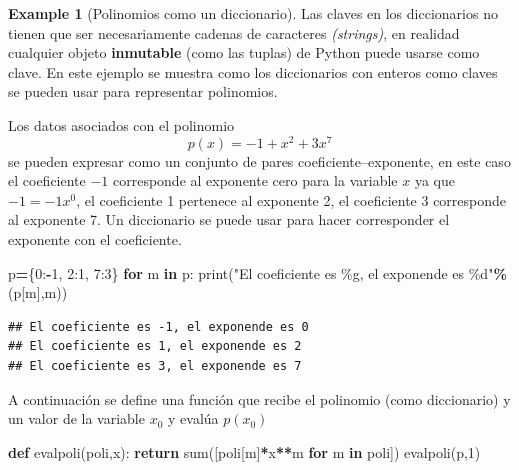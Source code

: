 \documentclass[
]{book}
\newenvironment{Shaded}{\begin{snugshade}}{\end{snugshade}}
\newcommand{\BuiltInTok}[1]{#1}
\newcommand{\ControlFlowTok}[1]{\textcolor[rgb]{0.13,0.29,0.53}{\textbf{#1}}}
\newcommand{\DecValTok}[1]{\textcolor[rgb]{0.00,0.00,0.81}{#1}}
\newcommand{\KeywordTok}[1]{\textcolor[rgb]{0.13,0.29,0.53}{\textbf{#1}}}
\newcommand{\NormalTok}[1]{#1}
\newcommand{\OperatorTok}[1]{\textcolor[rgb]{0.81,0.36,0.00}{\textbf{#1}}}
\newcommand{\SpecialCharTok}[1]{\textcolor[rgb]{0.00,0.00,0.00}{#1}}
\newcommand{\StringTok}[1]{\textcolor[rgb]{0.31,0.60,0.02}{#1}}
\theoremstyle{definition}
\theoremstyle{definition}
\newtheorem{example}{Example}[chapter]
\theoremstyle{definition}
\theoremstyle{definition}
\theoremstyle{remark}
\begin{document}
\begin{example}[Polinomios como un diccionario]
\protect\hypertarget{exm:PoliComoDict}{}\label{exm:PoliComoDict}Las claves en los diccionarios no tienen que ser necesariamente cadenas de caracteres \emph{(strings)}, en realidad cualquier objeto \textbf{inmutable} (como las tuplas) de Python puede usarse como clave. En este ejemplo se muestra como los diccionarios con enteros como claves se pueden usar para representar polinomios.

Los datos asociados con el polinomio
\begin{equation}
p(x)=-1+x^2 + 3x^7
\label{eq:polinomio}
\end{equation}
se pueden expresar como un conjunto de pares coeficiente--exponente, en este caso el coeficiente \(-1\) corresponde al exponente cero para la variable \(x\) ya que \(-1=-1x^0\), el coeficiente 1 pertenece al exponente 2, el coeficiente 3 corresponde al exponente 7. Un diccionario se puede usar para hacer corresponder el exponente con el coeficiente.

\begin{Shaded}
\begin{Highlighting}[]
\NormalTok{p}\OperatorTok{=}\NormalTok{\{}\DecValTok{0}\NormalTok{:}\OperatorTok{{-}}\DecValTok{1}\NormalTok{, }\DecValTok{2}\NormalTok{:}\DecValTok{1}\NormalTok{, }\DecValTok{7}\NormalTok{:}\DecValTok{3}\NormalTok{\} }
\ControlFlowTok{for}\NormalTok{ m }\KeywordTok{in}\NormalTok{ p:}
        \BuiltInTok{print}\NormalTok{(}\StringTok{"El coeficiente es }\SpecialCharTok{\%g}\StringTok{, el exponende es }\SpecialCharTok{\%d}\StringTok{"}\OperatorTok{\%}\NormalTok{(p[m],m))}
\end{Highlighting}
\end{Shaded}

\begin{verbatim}
## El coeficiente es -1, el exponende es 0
## El coeficiente es 1, el exponende es 2
## El coeficiente es 3, el exponende es 7
\end{verbatim}

A continuación se define una función que recibe el polinomio (como diccionario) y un valor de la variable \(x_0\) y evalúa \(p(x_0)\)

\begin{Shaded}
\begin{Highlighting}[]
\KeywordTok{def}\NormalTok{ evalpoli(poli,x):}
    \ControlFlowTok{return}  \BuiltInTok{sum}\NormalTok{([poli[m]}\OperatorTok{*}\NormalTok{x}\OperatorTok{**}\NormalTok{m }\ControlFlowTok{for}\NormalTok{ m }\KeywordTok{in}\NormalTok{ poli])}
\NormalTok{evalpoli(p,}\DecValTok{1}\NormalTok{) }
\end{Highlighting}
\end{Shaded}


\end{example}
\end{document}
